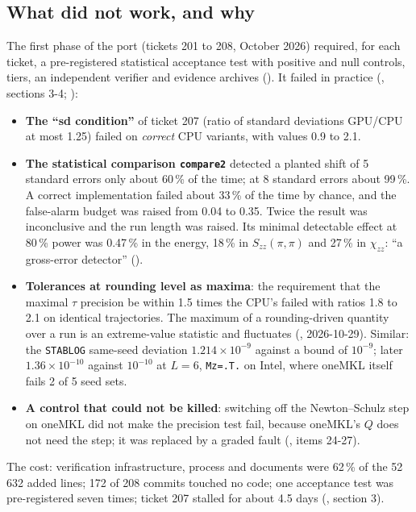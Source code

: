 \subsection{What did not work, and why}

The first phase of the port (tickets 201 to 208, October 2026) required, for each ticket, a pre-registered statistical acceptance test with positive and null controls, tiers, an independent verifier and evidence archives (). It failed in practice (, sections 3-4; ):
\begin{itemize}
\item \textbf{The ``sd condition''} of ticket 207 (ratio of standard deviations GPU/CPU at most 1.25) failed on \emph{correct} CPU variants, with values 0.9 to 2.1. %
\item \textbf{The statistical comparison \texttt{compare2}} detected a planted shift of 5 standard errors only about 60\,\% of the time; at 8 standard errors about 99\,\%. A correct implementation failed about 33\,\% of the time by chance, and the false-alarm budget was raised from 0.04 to 0.35. Twice the result was inconclusive and the run length was raised. Its minimal detectable effect at 80\,\% power was 0.47\,\% in the energy, 18\,\% in $S_{zz}(\pi,\pi)$ and 27\,\% in $\chi_{zz}$: ``a gross-error detector'' (). %
\item \textbf{Tolerances at rounding level as maxima}: the requirement that the maximal $\tau$ precision be within 1.5 times the CPU's failed with ratios 1.8 to 2.1 on identical trajectories. The maximum of a rounding-driven quantity over a run is an extreme-value statistic and fluctuates (, 2026-10-29). Similar: the \texttt{STABLOG} same-seed deviation $1.214\times10^{-9}$ against a bound of $10^{-9}$; later $1.36\times10^{-10}$ against $10^{-10}$ at $L=6$, \texttt{Mz=.T.} on Intel, where oneMKL itself fails 2 of 5 seed sets.
\item \textbf{A control that could not be killed}: switching off the Newton--Schulz step on oneMKL did not make the precision test fail, because oneMKL's $Q$ does not need the step; it was replaced by a graded fault (, items 24-27).
\end{itemize}
The cost: verification infrastructure, process and documents were 62\,\% of the 52\,632 added lines; 172 of 208 commits touched no code; one acceptance test was pre-registered seven times; ticket 207 stalled for about 4.5 days (, section 3). %
